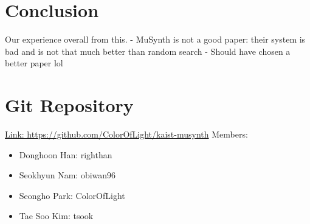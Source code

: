 \documentclass{article}
\begin{document}
\section{Conclusion}
Our experience overall from this.
 - MuSynth is not a good paper: their system is bad and is not that much better than random search
 - Should have chosen a better paper lol
 
\section{Git Repository}
\href{https://github.com/ColorOfLight/kaist-musynth}{Link: https://github.com/ColorOfLight/kaist-musynth} \newline Members:
\begin{itemize}
    \item Donghoon Han: righthan
    \item Seokhyun Nam: obiwan96
    \item Seongho Park: ColorOfLight
    \item Tae Soo Kim: tsook
\end{itemize}

\printbibliography
\end{document}
